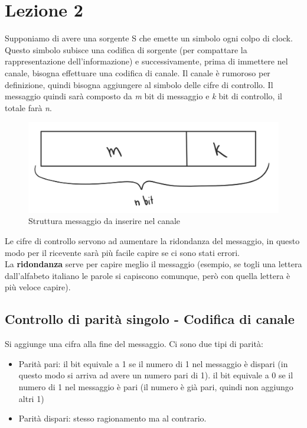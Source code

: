 \section*{Lezione 2}


Supponiamo di avere una sorgente S che emette un simbolo ogni colpo di clock.
Questo simbolo subisce una codifica di sorgente (per compattare la rappresentazione dell'informazione) e successivamente, prima di immettere nel canale, bisogna effettuare una codifica di canale.
Il canale è rumoroso per definizione, quindi bisogna aggiungere al simbolo delle cifre di controllo.
Il messaggio quindi sarà composto da \textit{m} bit di messaggio e \textit{k} bit di controllo, il totale farà \textit{n}.

\begin{figure}[h]
	\centering
	\includegraphics[width=\linewidth]{immagini/img1}
	\caption{Struttura messaggio da inserire nel canale}
\end{figure}

Le cifre di controllo servono ad aumentare la ridondanza del messaggio, in questo modo per il ricevente sarà più facile capire se ci sono stati errori.\\
La \textbf{ridondanza} serve per capire meglio il messaggio (esempio, se togli una lettera dall'alfabeto italiano le parole si capiscono comunque, però con quella lettera è più veloce capire).

\subsection*{Controllo di parità singolo - Codifica di canale}

Si aggiunge una cifra alla fine del messaggio.
Ci sono due tipi di parità:
\begin{itemize}
	\item Parità pari: il bit equivale a 1 se il numero di 1 nel messaggio è dispari (in questo modo si arriva ad avere un numero pari di 1).
	il bit equivale a 0 se il numero di 1 nel messaggio è pari (il numero è già pari, quindi non aggiungo altri 1)
	\item Parità dispari: stesso ragionamento ma al contrario.
\end{itemize}

